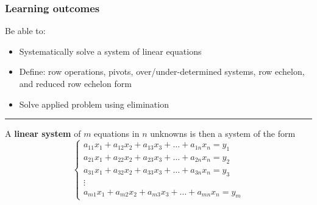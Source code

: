  





\subsubsection*{Learning outcomes}
Be able to:
\begin{itemize}
	 \item Systematically solve a system of linear equations
	 \item Define: row operations, pivots, over/under-determined systems, row echelon, and reduced row echelon form
	 \item Solve applied problem using elimination
	
\end{itemize}





\rule[0.01in]{\textwidth}{0.0025in}



 \begin{tcolorbox}[colback=yellow!10!,colframe=gray!15!]
 \begin{definition}
A \textbf{linear system} of $m$ equations in $n$ unknowns is then a system of the form
\[ 
\begin{cases} 
a_{11} x_1 + a_{12} x_2 + a_{13} x_3 + \dots + a_{1n} x_n = y_1\\
 a_{21} x_1 + a_{22} x_2 + a_{23} x_3 + \dots + a_{2n} x_n = y_2\\
a_{31} x_1 + a_{32} x_2 + a_{33} x_3 + \dots + a_{3n} x_n = y_3\\

\vdots \\

a_{m1} x_1 + a_{m2} x_2 + a_{m3} x_3 + \dots + a_{mn} x_n = y_m
\end{cases}
\]
 \end{definition}	 
 \end{tcolorbox} 
 
